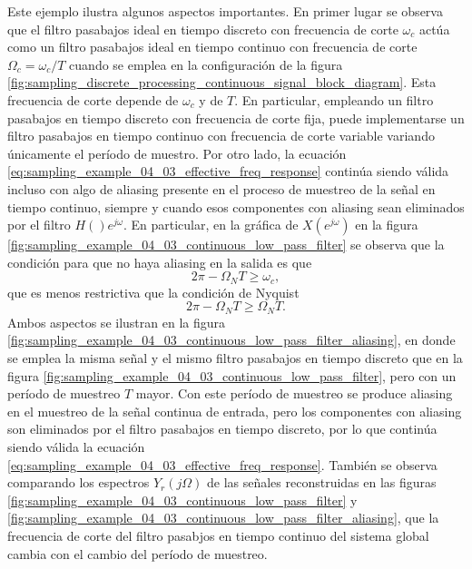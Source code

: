 \documentclass[a4paper]{report}
\begin{document}
Este ejemplo ilustra algunos aspectos importantes. En primer lugar se observa que el filtro pasabajos ideal en tiempo discreto con frecuencia de corte \(\omega_c\) actúa como un filtro pasabajos ideal en tiempo continuo con frecuencia de corte \(\Omega_c=\omega_c/T\) cuando se emplea en la configuración de la figura \ref{fig:sampling_discrete_processing_continuous_signal_block_diagram}. Esta frecuencia de corte depende de \(\omega_c\) y de \(T\). En particular, empleando un filtro pasabajos en tiempo discreto con frecuencia de corte fija, puede implementarse un filtro pasabajos en tiempo continuo con frecuencia de corte variable variando únicamente el período de muestro. Por otro lado, la ecuación \ref{eq:sampling_example_04_03_effective_freq_response} continúa siendo válida incluso con algo de aliasing presente en el proceso de muestreo de la señal en tiempo continuo, siempre y cuando esos componentes con aliasing sean eliminados por el filtro \(H()e^{j\omega}\). En particular, en la gráfica de \(X(e^{j\omega})\) en la figura \ref{fig:sampling_example_04_03_continuous_low_pass_filter} se observa que la condición para que no haya aliasing en la salida es que 
\[
 2\pi-\Omega_NT\geq\omega_c,
\]
que es menos restrictiva que la condición de Nyquist
\[
 2\pi-\Omega_NT\geq\Omega_NT.
\]
Ambos aspectos se ilustran en la figura \ref{fig:sampling_example_04_03_continuous_low_pass_filter_aliasing}, en donde se emplea la misma señal y el mismo filtro pasabajos en tiempo discreto que en la figura \ref{fig:sampling_example_04_03_continuous_low_pass_filter}, pero con un período de muestreo \(T\) mayor. Con este período de muestreo se produce aliasing en el muestreo de la señal continua de entrada, pero los componentes con aliasing son eliminados por el filtro pasabajos en tiempo discreto, por lo que continúa siendo válida la ecuación \ref{eq:sampling_example_04_03_effective_freq_response}. También se observa comparando los espectros \(Y_r(j\Omega)\) de las señales reconstruidas en las figuras \ref{fig:sampling_example_04_03_continuous_low_pass_filter} y \ref{fig:sampling_example_04_03_continuous_low_pass_filter_aliasing}, que la frecuencia de corte del filtro pasabjos en tiempo continuo del sistema global cambia con el cambio del período de muestreo.
\end{document}
